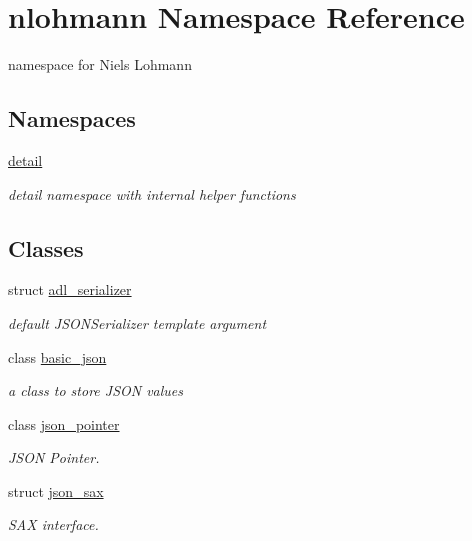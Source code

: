 \hypertarget{namespacenlohmann}{}\section{nlohmann Namespace Reference}
\label{namespacenlohmann}


namespace for Niels Lohmann  


\subsection*{Namespaces}
\begin{DoxyCompactItemize}
\item 
 \hyperlink{namespacenlohmann_1_1detail}{detail}
\begin{DoxyCompactList}\small\item\em detail namespace with internal helper functions \end{DoxyCompactList}\end{DoxyCompactItemize}
\subsection*{Classes}
\begin{DoxyCompactItemize}
\item 
struct \hyperlink{structnlohmann_1_1adl__serializer}{adl\+\_\+serializer}
\begin{DoxyCompactList}\small\item\em default J\+S\+O\+N\+Serializer template argument \end{DoxyCompactList}\item 
class \hyperlink{classnlohmann_1_1basic__json}{basic\+\_\+json}
\begin{DoxyCompactList}\small\item\em a class to store J\+S\+ON values \end{DoxyCompactList}\item 
class \hyperlink{classnlohmann_1_1json__pointer}{json\+\_\+pointer}
\begin{DoxyCompactList}\small\item\em J\+S\+ON Pointer. \end{DoxyCompactList}\item 
struct \hyperlink{structnlohmann_1_1json__sax}{json\+\_\+sax}
\begin{DoxyCompactList}\small\item\em S\+AX interface. \end{DoxyCompactList}\end{DoxyCompactItemize}
